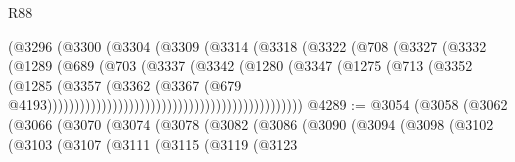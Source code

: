 \begin{lexlean}{R88}
\begin{coremodule}
                                                (@3296
                                                  (@3300
                                                    (@3304
                                                      (@3309
                                                        (@3314
                                                          (@3318
                                                            (@3322
                                                              (@708
                                                                (@3327
                                                                  (@3332
                                                                    (@1289
                                                                      (@689
                                                                        (@703
                                                                          (@3337
                                                                            (@3342
                                                                              (@1280
                                                                                (@3347
                                                                                  (@1275
                                                                                    (@713
                                                                                      (@3352
                                                                                        (@1285
                                                                                          (@3357
                                                                                            (@3362
                                                                                              (@3367
                                                                                                (@679
                                                                                                  @4193)))))))))))))))))))))))))))))))))))))))))))))))
@4289 := @3054
    (@3058
      (@3062
        (@3066
          (@3070
            (@3074
              (@3078
                (@3082
                  (@3086
                    (@3090
                      (@3094
                        (@3098
                          (@3102
                            (@3103
                              (@3107
                                (@3111
                                  (@3115
                                    (@3119
                                      (@3123

\end{coremodule}
\end{lexlean}
